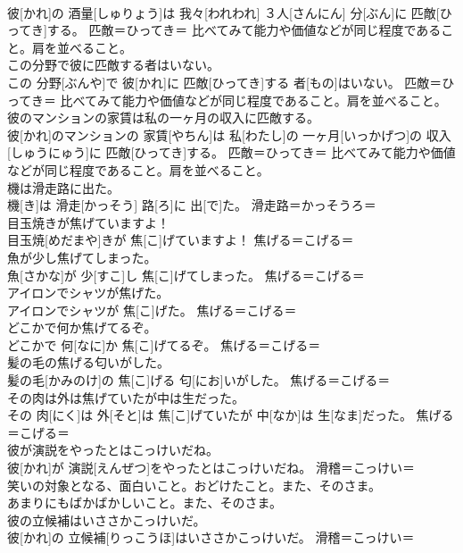 \documentclass[8pt]{extreport}
\begin{document}
\begin{CJK}{UTF8}{min}
{\\	彼[かれ]の 酒量[しゅりょう]は 我々[われわれ] ３人[さんにん] 分[ぶん]に 匹敵[ひってき]する。	匹敵＝ひってき＝ 比べてみて能力や価値などが同じ程度であること。肩を並べること。
\\	この分野で彼に匹敵する者はいない。	
\\	この 分野[ぶんや]で 彼[かれ]に 匹敵[ひってき]する 者[もの]はいない。	匹敵＝ひってき＝ 比べてみて能力や価値などが同じ程度であること。肩を並べること。
\\	彼のマンションの家賃は私の一ヶ月の収入に匹敵する。	
\\	彼[かれ]のマンションの 家賃[やちん]は 私[わたし]の 一ヶ月[いっかげつ]の 収入[しゅうにゅう]に 匹敵[ひってき]する。	匹敵＝ひってき＝ 比べてみて能力や価値などが同じ程度であること。肩を並べること。
\\	機は滑走路に出た。	
\\	機[き]は 滑走[かっそう] 路[ろ]に 出[で]た。	滑走路＝かっそうろ＝ 
\\	目玉焼きが焦げていますよ！	
\\	目玉焼[めだまや]きが 焦[こ]げていますよ！	焦げる＝こげる＝ 
\\	魚が少し焦げてしまった。	
\\	魚[さかな]が 少[すこ]し 焦[こ]げてしまった。	焦げる＝こげる＝ 
\\	アイロンでシャツが焦げた。	
\\	アイロンでシャツが 焦[こ]げた。	焦げる＝こげる＝ 
\\	どこかで何か焦げてるぞ。	
\\	どこかで 何[なに]か 焦[こ]げてるぞ。	焦げる＝こげる＝ 
\\	髪の毛の焦げる匂いがした。	
\\	髪の毛[かみのけ]の 焦[こ]げる 匂[にお]いがした。	焦げる＝こげる＝ 
\\	その肉は外は焦げていたが中は生だった。	
\\	その 肉[にく]は 外[そと]は 焦[こ]げていたが 中[なか]は 生[なま]だった。	焦げる＝こげる＝ 
\\	彼が演説をやったとはこっけいだね。	
\\	彼[かれ]が 演説[えんぜつ]をやったとはこっけいだね。	滑稽＝こっけい＝ 
\\	笑いの対象となる、面白いこと。おどけたこと。また、そのさま。 
\\	あまりにもばかばかしいこと。また、そのさま。
\\	彼の立候補はいささかこっけいだ。	
\\	彼[かれ]の 立候補[りっこうほ]はいささかこっけいだ。	滑稽＝こっけい＝ 
}
\end{CJK}
\end{document}
